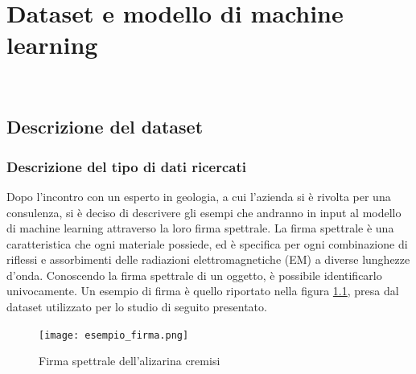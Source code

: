 
\chapter{Dataset e modello di machine learning}
\label{cap:machine-learning}

\\

\section{Descrizione del dataset}
\subsection{Descrizione del tipo di dati ricercati}
Dopo l'incontro con un esperto in geologia, a cui l'azienda si è rivolta per una consulenza, si è deciso di descrivere gli esempi che andranno in input al modello di machine learning attraverso la loro firma spettrale.
La firma spettrale è una caratteristica che ogni materiale possiede, ed è specifica per ogni combinazione di riflessi e assorbimenti delle radiazioni elettromagnetiche (EM) a diverse lunghezze d'onda. Conoscendo la firma spettrale di un oggetto, è possibile identificarlo univocamente.
Un esempio di firma è quello riportato nella figura \ref{fig:esempio_firma}, presa dal dataset utilizzato per lo studio di seguito presentato.
\begin{figure}
    \centering
    \texttt{[image: esempio\_firma.png]}
    \caption{Firma spettrale dell'alizarina cremisi}
    \label{fig:esempio_firma}
\end{figure}

